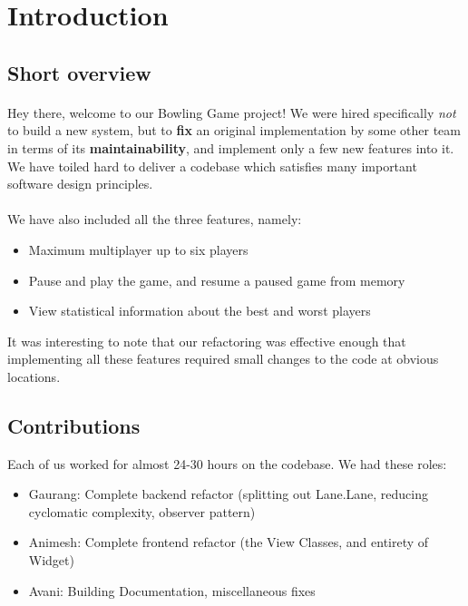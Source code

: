 \section{Introduction}

\subsection{Short overview}

\paragraph{} Hey there, welcome to our Bowling Game project! We were hired specifically \textit{not} to build a new system, but to \textbf{fix} an original implementation by some other team in terms of its \textbf{maintainability}, and implement only a few new features into it. We have toiled hard to deliver a codebase which satisfies many important software design principles.
\paragraph{} We have also included all the three features, namely:
\begin{itemize}
    \item Maximum multiplayer up to six players
    \item Pause and play the game, and resume a paused game from memory
    \item View statistical information about the best and worst players
\end{itemize}

It was interesting to note that our refactoring was effective enough that implementing all these features required small changes to the code at obvious locations.

\subsection{Contributions}

Each of us worked for almost 24-30 hours on the codebase. We had these roles:

\begin{itemize}
    \item Gaurang: Complete backend refactor (splitting out Lane.Lane, reducing cyclomatic complexity, observer pattern)
    \item Animesh: Complete frontend refactor (the View Classes, and entirety of Widget)
    \item Avani: Building Documentation, miscellaneous fixes
\end{itemize}